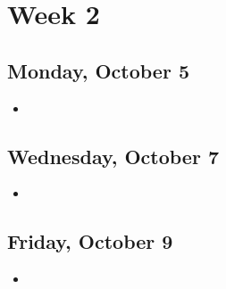 \documentclass[12pt,a4paper]{article}
\begin{document}

\clearpage
\section{Week 2}
\subsection{Monday, October 5}
\begin{itemize}
    \item 
\end{itemize}

\subsection{Wednesday, October 7}
\begin{itemize}
    \item 
\end{itemize}

\subsection{Friday, October 9}
\begin{itemize}
    \item 
\end{itemize}
\end{document}
